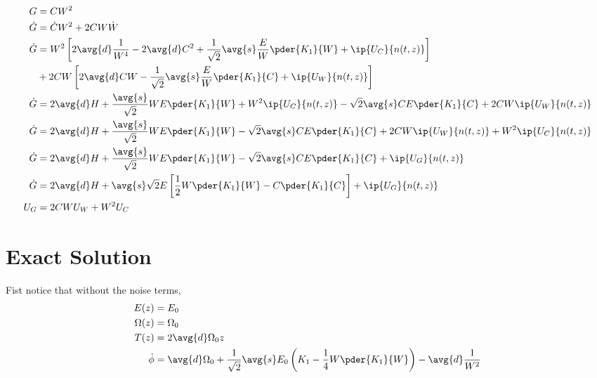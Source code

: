\begin{equation}
\begin{split}
G &= C W^2\\
\dot{G} &= \dot{C} W^2 + 2 C W \dot{W}\\ 
\dot{G} &= W^2\left[2 \avg{d} \frac{1}{W^4}  - 2 \avg{d} C^2 + \frac{1}{\sqrt{2}}\avg{s} \frac{E}{W} \pder{K_1}{W} + \ip{U_C}{ n(t,z)}\right] \\
        &+ 2 C W \left[2 \avg{d} C W - \frac{1}{\sqrt{2}} \avg{s} \frac{E}{W} \pder{K_1}{C} + \ip{U_W}{ n(t,z)}\right]\\
\dot{G} &= 2 \avg{d} H + \frac{\avg{s}}{\sqrt{2}} W E \pder{K_1}{W} + W^2 \ip{U_C}{ n(t,z)} - \sqrt{2}\avg{s}  C E \pder{K_1}{C} + 2 C W  \ip{U_W}{ n(t,z)}\\
\dot{G} &= 2 \avg{d} H + \frac{\avg{s}}{\sqrt{2}} W E \pder{K_1}{W}  - \sqrt{2}\avg{s}  C E \pder{K_1}{C} + 2 C W \ip{U_W}{ n(t,z)} + W^2 \ip{U_C}{ n(t,z)}\\
\dot{G} &= 2 \avg{d} H + \frac{\avg{s}}{\sqrt{2}} W E \pder{K_1}{W}  - \sqrt{2}\avg{s}  C E \pder{K_1}{C} + \ip{U_G}{ n(t,z)}\\
\dot{G} &= 2 \avg{d} H + \avg{s}\sqrt{2} E \left[ \frac{1}{2} W \pder{K_1}{W}  - C \pder{K_1}{C}\right] + \ip{U_G}{ n(t,z)}\\
U_G &= 2 C W U_W + W^2 U_C
\end{split}
\end{equation}

\section{Exact Solution}
Fist notice that without the noise terms,
\begin{equation}
\begin{split}
 E(z) &=  E_0 \\
 \Omega(z) & =  \Omega_0 \\
 T(z) &=  2\avg{d} \Omega_0 z \\
 \dot{\phi} &= \avg{d} \Omega_0  + \frac{1}{\sqrt{2}} \avg{s} E_0 \left(K_1 - \frac{1}{4}  W \pder{K_1}{W}\right) - \avg{d} \frac{1}{W^2} \\
\end{split}
\end{equation}

